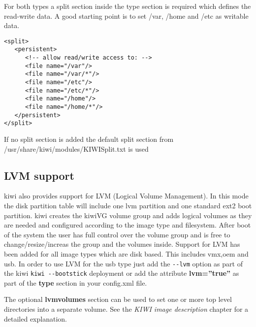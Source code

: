 For both types a split section inside the type section is required
which defines the read-write data. A good starting point is
to set /var, /home and /etc as writable data.

\begin{Command}{12cm}
\begin{verbatim}
<split>
   <persistent>
      <!-- allow read/write access to: -->
      <file name="/var"/>
      <file name="/var/*"/>
      <file name="/etc"/>
      <file name="/etc/*"/>
      <file name="/home"/>
      <file name="/home/*"/>
   </persistent>
</split>
\end{verbatim}
\end{Command}

If no split section is added the default split section from
/usr/share/kiwi/modules/KIWISplit.txt is used

\subsection{LVM support}

kiwi also provides support for LVM (Logical Volume Management). In this
mode the disk partition table will include one lvm partition and one
standard ext2 boot partition. kiwi creates the kiwiVG volume group and
adds logical volumes as they are needed and configured according to the
image type and filesystem. After boot of the system the user has full
control over the volume group and is free to change/resize/increas the
group and the volumes inside. Support for LVM has been added for all
image types which are disk based. This includes vmx,oem and usb.
In order to use LVM for the usb type just add the \verb+--lvm+ option
as part of the kiwi \verb+kiwi --bootstick+ deployment or add the
attribute \textbf{lvm=''true''} as part of the \textbf{type} section
in your config.xml file.

The optional \textbf{lvmvolumes} section can be used to set one or
more top level directories into a separate volume. See the
\textit{KIWI image description} chapter for a detailed explanation.
